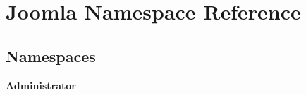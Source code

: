\section{Joomla Namespace Reference}
\label{namespace_joomla}
\subsection*{Namespaces}
\begin{DoxyCompactItemize}
\item 
 \textbf{ Administrator}
\end{DoxyCompactItemize}

